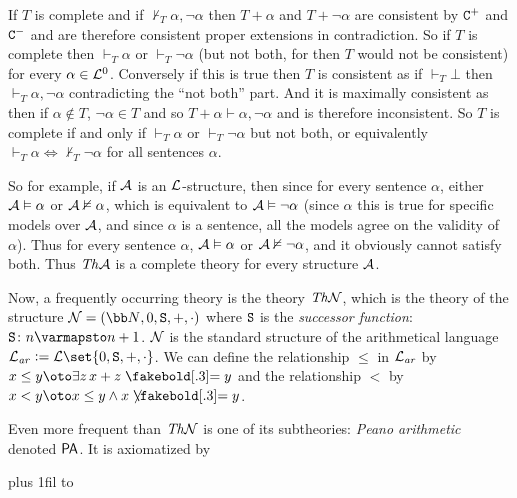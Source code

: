 \edefn

If $T$ is complete and if $\nvdash_T\alpha,\neg\alpha$ then $T+\alpha$ and $T+\neg\alpha$ are consistent by ${\tt C}^+$ and ${\tt C}^-$ and are therefore consistent proper extensions in contradiction.
So if $T$ is complete then $\vdash_T\alpha$ or $\vdash_T\neg\alpha$ (but not both, for then $T$ would not be consistent) for every $\alpha\in{\cal L}^0$.
Conversely if this is true then $T$ is consistent as if $\vdash_T\bot$ then $\vdash_T\alpha,\neg\alpha$ contradicting the ``not both'' part.
And it is maximally consistent as then if $\alpha\notin T$, $\neg\alpha\in T$ and so $T+\alpha\vdash\alpha,\neg\alpha$ and is therefore inconsistent.
So $T$ is complete if and only if $\vdash_T\alpha$ or $\vdash_T\neg\alpha$ but not both, or equivalently $\vdash_T\alpha\iff\nvdash_T\neg\alpha$ for all sentences $\alpha$.

So for example, if ${\cal A}$ is an ${\cal L}$-structure, then since for every sentence $\alpha$, either ${\cal A}\vDash\alpha$ or ${\cal A}\nvDash\alpha$, which is equivalent to ${\cal A}\vDash\neg\alpha$
(since $\alpha$ this is true for specific models over ${\cal A}$, and since $\alpha$ is a sentence, all the models agree on the validity of $\alpha$).
Thus for every sentence $\alpha$, ${\cal A}\vDash\alpha$ or ${\cal A}\nvDash\neg\alpha$, and it obviously cannot satisfy both.
Thus ${\it Th}{\cal A}$ is a complete theory for every structure ${\cal A}$.

Now, a frequently occurring theory is the theory ${\it Th}{\cal N}$, which is the theory of the structure ${\cal N}=({\bb N},0,{\tt S},+,\cdot)$ where ${\tt S}$ is the
{\it successor function}: ${\tt S}\colon n\varmapsto n+1$.
${\cal N}$ is the standard structure of the arithmetical language ${\cal L}_{\it ar}\coloneqq{\cal L}\set{0,{\tt S},+,\cdot}$.
We can define the relationship $\leq$ in ${\cal L}_{\it ar}$ by $x\leq y\oto\exists z\,x+z\eq y$ and the relationship $<$ by $x<y\oto x\leq y\land x\neqb y$.

Even more frequent than ${\it Th}{\cal N}$ is one of its subtheories: {\it Peano arithmetic} denoted ${\sf PA}$.
It is axiomatized by

\medskip
\tabskip=0pt plus 1fil
{\jot\halign to}
\medskip

